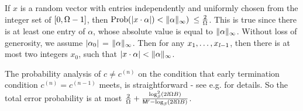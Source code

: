 If $x$ is a random vector with entries 
independently and uniformly chosen from the integer set of $[0, \Omega-1]$,
then $\mbox{Prob} (|x \cdot \alpha|) < \|\alpha\|_\infty)$
$\leq \frac{2}{\Omega}$.
This is true since
there is at least one entry of $\alpha$, whose absolute value is
equal to $\|\alpha\|_\infty$.
Without loss of generosity, we assume $|\alpha_0|$ = $\|\alpha\|_\infty$.
Then for any $x_1, \ldots, x_{\mathit l-1}$, then there is at most two integers $x_0$, 
such that $|x \cdot \alpha| < \|\alpha\|_\infty$.

The probability analysis of $c \not= c^{(n)}$ 
on the condition that early termination condition $c^{(n)} = c^{(n-1)}$ meets,
is straightforward - see e.g. \cite[Theorem 1.]{Kaltofen02} for details.
So the total error probability is at most 
$\frac{2}{\Omega} +
\frac{\log^2_{\beta}(2\mathit l \Omega B)}
{\mathsf M^\prime - \log_{\beta}(2\mathit l \Omega B)}$.
%
%
%
%
%
\QED

